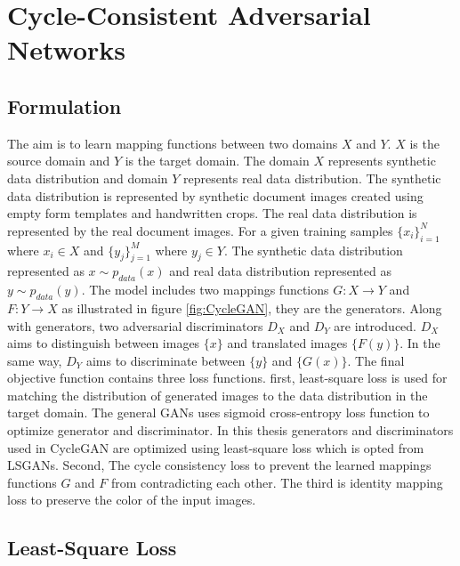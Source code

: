 \section{Cycle-Consistent Adversarial Networks}\label{CycleConsistentAdversarialNetworks}


\subsection{Formulation}


The aim is to learn mapping functions between two domains $X$ and $Y$. $X$ is the source domain and $Y$ is the target domain. The domain $X$ represents synthetic data distribution and domain $Y$ represents real data distribution. The synthetic data distribution is represented by synthetic document images created using empty form templates and handwritten crops. The real data distribution is represented by the real document images. For a given training samples $\{x_i\}_{i=1}^{N}$ where $x_i \in X$ and $\{y_j\}_{j=1}^{M}$ where $y_j \in Y$. The synthetic data distribution represented as $x \sim p_{data}(x)$ and real data distribution represented as $y \sim p_{data}(y)$. The model includes two mappings functions $G : X \rightarrow Y$ and $F : Y \rightarrow X$ as illustrated in figure \ref{fig:CycleGAN}, they are the generators. Along with generators, two adversarial discriminators $D_X$ and $D_Y$ are introduced. $D_X$ aims to distinguish between images $\{x\}$ and translated images $\{F(y)\}$. In the same way, $D_Y$ aims to discriminate between $\{y\}$ and $\{G(x)\}$.  The final objective function contains three loss functions. first, least-square loss\cite{mao2017squares} is used for matching the distribution of generated images to the data distribution in the target domain. The general \acp{GAN} uses sigmoid cross-entropy loss function to optimize generator and discriminator. In this thesis generators and discriminators used in \ac{CycleGAN} are optimized using least-square loss\cite{mao2017squares} which is opted from \acp{LSGAN}. Second, The cycle consistency loss to prevent the learned mappings functions $G$ and $F$ from contradicting each other\cite{zhu2020unpaired}. The third is identity mapping loss to preserve the color of the input images\cite{zhu2020unpaired}.


\subsection{Least-Square Loss}


